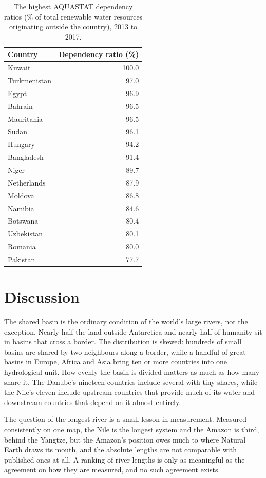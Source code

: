\documentclass[11pt,a4paper]{article}
\begin{document}
\begin{table}[tbp]\centering\small\caption{The highest AQUASTAT dependency ratios (\% of total renewable water resources originating outside the country), 2013 to 2017.}\label{tab:dep}\label{fig:depbars}\begin{tabular}{lr}\toprule Country & Dependency ratio (\%)\\\midrule
Kuwait & 100.0\\
Turkmenistan & 97.0\\
Egypt & 96.9\\
Bahrain & 96.5\\
Mauritania & 96.5\\
Sudan & 96.1\\
Hungary & 94.2\\
Bangladesh & 91.4\\
Niger & 89.7\\
Netherlands & 87.9\\
Moldova & 86.8\\
Namibia & 84.6\\
Botswana & 80.4\\
Uzbekistan & 80.1\\
Romania & 80.0\\
Pakistan & 77.7\\
\bottomrule\end{tabular}\end{table}

\section{Discussion}
The shared basin is the ordinary condition of the world's large rivers, not the exception. Nearly half the land outside Antarctica and nearly half of humanity sit in basins that cross a border. The distribution is skewed: hundreds of small basins are shared by two neighbours along a border, while a handful of great basins in Europe, Africa and Asia bring ten or more countries into one hydrological unit. How evenly the basin is divided matters as much as how many share it. The Danube's nineteen countries include several with tiny shares, while the Nile's eleven include upstream countries that provide much of its water and downstream countries that depend on it almost entirely.

The question of the longest river is a small lesson in measurement. Measured consistently on one map, the Nile is the longest system and the Amazon is third, behind the Yangtze, but the Amazon's position owes much to where Natural Earth draws its mouth, and the absolute lengths are not comparable with published ones at all. A ranking of river lengths is only as meaningful as the agreement on how they are measured, and no such agreement exists.
\end{document}
